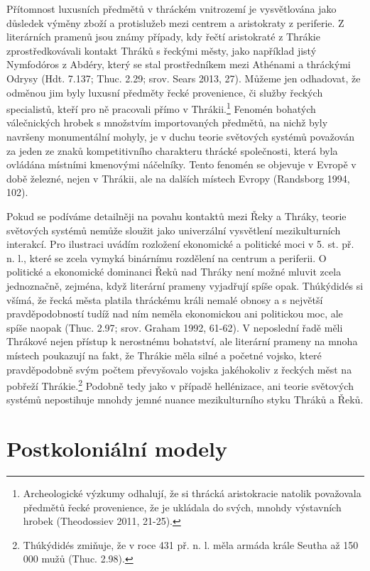 Přítomnost luxusních předmětů v thráckém vnitrozemí je vysvětlována jako důsledek výměny zboží a protislužeb mezi centrem a aristokraty z periferie. Z literárních pramenů jsou známy případy, kdy řečtí aristokraté z Thrákie zprostředkovávali kontakt Thráků s řeckými městy, jako například jistý Nymfodóros z Abdéry, který se stal prostředníkem mezi Athénami a thráckými Odrysy (Hdt. 7.137; Thuc. 2.29; srov. Sears 2013, 27). Můžeme jen odhadovat, že odměnou jim byly luxusní předměty řecké provenience, či služby řeckých specialistů, kteří pro ně pracovali přímo v Thrákii.\footnote{Archeologické výzkumy odhalují, že si thrácká aristokracie natolik považovala předmětů řecké provenience, že je ukládala do svých, mnohdy výstavních hrobek (Theodossiev 2011, 21-25).} Fenomén bohatých válečnických hrobek s množstvím importovaných předmětů, na nichž byly navršeny monumentální mohyly, je v duchu teorie světových systémů považován za jeden ze znaků kompetitivního charakteru thrácké společnosti, která byla ovládána místními kmenovými náčelníky. Tento fenomén se objevuje v Evropě v době železné, nejen v Thrákii, ale na dalších místech Evropy (Randsborg 1994, 102).

Pokud se podíváme detailněji na povahu kontaktů mezi Řeky a Thráky, teorie světových systémů nemůže sloužit jako univerzální vysvětlení mezikulturních interakcí. Pro ilustraci uvádím rozložení ekonomické a politické moci v 5. st. př. n. l., které se zcela vymyká binárnímu rozdělení na centrum a periferii. O politické a ekonomické dominanci Řeků nad Thráky není možné mluvit zcela jednoznačně, zejména, když literární prameny vyjadřují spíše opak. Thúkýdidés si všímá, že řecká města platila thráckému králi nemalé obnosy a s největší pravděpodobností tudíž nad ním neměla ekonomickou ani politickou moc, ale spíše naopak (Thuc. 2.97; srov. Graham 1992, 61-62). V neposlední řadě měli Thrákové nejen přístup k nerostnému bohatství, ale literární prameny na mnoha místech poukazují na fakt, že Thrákie měla silné a početné vojsko, které pravděpodobně svým počtem převyšovalo vojska jakéhokoliv z řeckých měst na pobřeží Thrákie.\footnote{Thúkýdidés zmiňuje, že v roce 431 př. n. l. měla armáda krále Seutha až 150 000 mužů (Thuc. 2.98).} Podobně tedy jako v případě hellénizace, ani teorie světových systémů nepostihuje mnohdy jemné nuance mezikulturního styku Thráků a Řeků.

\section[postkoloniální-modely]{Postkoloniální modely}

